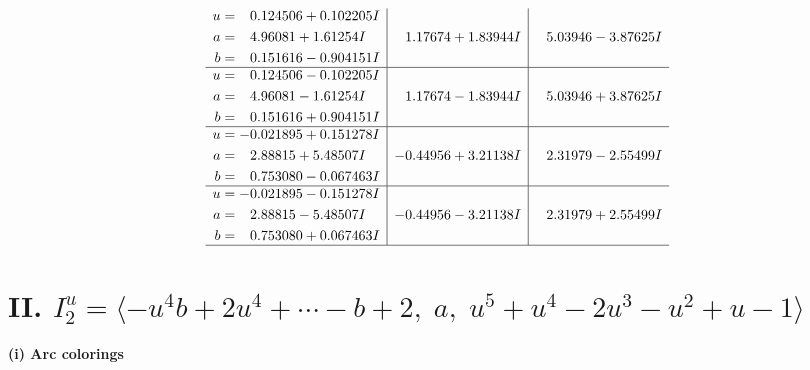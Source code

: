\documentclass[1p]{elsarticle_modified}
\theoremstyle{definition}
\begin{document}
$$\begin{array}{c|c|c}
\begin{aligned}
u &= \phantom{-}0.124506 + 0.102205 I \\
a &= \phantom{-}4.96081 + 1.61254 I \\
b &= \phantom{-}0.151616 - 0.904151 I\end{aligned}
 & \phantom{-}1.17674 + 1.83944 I & \phantom{-}5.03946 - 3.87625 I \\ \hline\begin{aligned}
u &= \phantom{-}0.124506 - 0.102205 I \\
a &= \phantom{-}4.96081 - 1.61254 I \\
b &= \phantom{-}0.151616 + 0.904151 I\end{aligned}
 & \phantom{-}1.17674 - 1.83944 I & \phantom{-}5.03946 + 3.87625 I \\ \hline\begin{aligned}
u &= -0.021895 + 0.151278 I \\
a &= \phantom{-}2.88815 + 5.48507 I \\
b &= \phantom{-}0.753080 - 0.067463 I\end{aligned}
 & -0.44956 + 3.21138 I & \phantom{-}2.31979 - 2.55499 I \\ \hline\begin{aligned}
u &= -0.021895 - 0.151278 I \\
a &= \phantom{-}2.88815 - 5.48507 I \\
b &= \phantom{-}0.753080 + 0.067463 I\end{aligned}
 & -0.44956 - 3.21138 I & \phantom{-}2.31979 + 2.55499 I\\
 \hline 
 \end{array}$$\newpage\newpage\renewcommand{\arraystretch}{1}
\centering \section*{II. $I^u_{2}= \langle - u^4 b+2 u^4+\cdots- b+2,\;a,\;u^5+u^4-2 u^3- u^2+u-1 \rangle$}
\flushleft \textbf{(i) Arc colorings}\\
\end{document}
